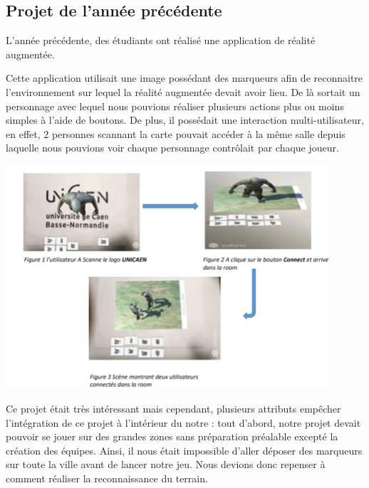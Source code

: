 \documentclass[12pt]{article}
\begin{document}
\subsection{Projet de l'année précédente}
L'année précédente, des étudiants ont réalisé une application de réalité augmentée.\par
Cette application utilisait une image possédant des marqueurs afin de reconnaitre l'environnement sur lequel la réalité augmentée devait avoir lieu. De là sortait un personnage avec lequel nous pouvions réaliser plusieurs actions plus ou moins simples à l'aide de boutons.
\newline
De plus, il possédait une interaction multi-utilisateur, en effet, 2 personnes scannant la carte pouvait accéder à la même salle depuis laquelle nous pouvions voir chaque personnage contrôlait par chaque joueur.
	\begin{center}		\includegraphics[width=0.9\textwidth]{projetAnneeDerniere.png}
	\end{center}
\par
Ce projet était très intéressant mais cependant, plusieurs attributs empêcher l'intégration de ce projet à l'intérieur du notre : tout d'abord, notre projet devait pouvoir se jouer sur des grandes zones sans préparation préalable excepté la création des équipes. Ainsi, il nous était impossible d'aller déposer des marqueurs sur toute la ville avant de lancer notre jeu. Nous devions donc repenser à comment réaliser la reconnaissance du terrain.
\end{document}
